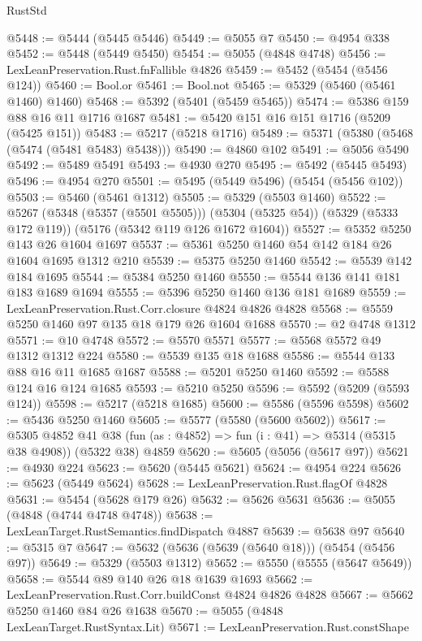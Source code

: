 \begin{lexlean}{RustStd}
\begin{coremodule}
@5448 := @5444 (@5445 @5446)
@5449 := @5055 @7
@5450 := @4954 @338
@5452 := @5448 (@5449 @5450)
@5454 := @5055 (@4848 @4748)
@5456 := LexLeanPreservation.Rust.fnFallible @4826
@5459 := @5452 (@5454 (@5456 @124))
@5460 := Bool.or
@5461 := Bool.not
@5465 := @5329 (@5460 (@5461 @1460) @1460)
@5468 := @5392 (@5401 (@5459 @5465))
@5474 := @5386 @159 @88 @16 @11 @1716 @1687
@5481 := @5420 @151 @16 @151 @1716 (@5209 (@5425 @151))
@5483 := @5217 (@5218 @1716)
@5489 := @5371 (@5380 (@5468 (@5474 (@5481 @5483) @5438)))
@5490 := @4860 @102
@5491 := @5056 @5490
@5492 := @5489 @5491
@5493 := @4930 @270
@5495 := @5492 (@5445 @5493)
@5496 := @4954 @270
@5501 := @5495 (@5449 @5496) (@5454 (@5456 @102))
@5503 := @5460 (@5461 @1312)
@5505 := @5329 (@5503 @1460)
@5522 := @5267
    (@5348 (@5357 (@5501 @5505)))
    (@5304 (@5325 @54))
    (@5329 (@5333 @172 @119))
    (@5176 (@5342 @119 @126 @1672 @1604))
@5527 := @5352 @5250 @143 @26 @1604 @1697
@5537 := @5361 @5250 @1460 @54 @142 @184 @26 @1604 @1695 @1312 @210
@5539 := @5375 @5250 @1460
@5542 := @5539 @142 @184 @1695
@5544 := @5384 @5250 @1460
@5550 := @5544 @136 @141 @181 @183 @1689 @1694
@5555 := @5396 @5250 @1460 @136 @181 @1689
@5559 := LexLeanPreservation.Rust.Corr.closure @4824 @4826 @4828
@5568 := @5559 @5250 @1460 @97 @135 @18 @179 @26 @1604 @1688
@5570 := @2 @4748 @1312
@5571 := @10 @4748
@5572 := @5570 @5571
@5577 := @5568 @5572 @49 @1312 @1312 @224
@5580 := @5539 @135 @18 @1688
@5586 := @5544 @133 @88 @16 @11 @1685 @1687
@5588 := @5201 @5250 @1460
@5592 := @5588 @124 @16 @124 @1685
@5593 := @5210 @5250
@5596 := @5592 (@5209 (@5593 @124))
@5598 := @5217 (@5218 @1685)
@5600 := @5586 (@5596 @5598)
@5602 := @5436 @5250 @1460
@5605 := @5577 (@5580 (@5600 @5602))
@5617 := @5305
    @4852
    @41
    @38
    (fun (as : @4852) => fun (i : @41) => @5314 (@5315 @38 @4908))
    (@5322 @38)
    @4859
@5620 := @5605 (@5056 (@5617 @97))
@5621 := @4930 @224
@5623 := @5620 (@5445 @5621)
@5624 := @4954 @224
@5626 := @5623 (@5449 @5624)
@5628 := LexLeanPreservation.Rust.flagOf @4828
@5631 := @5454 (@5628 @179 @26)
@5632 := @5626 @5631
@5636 := @5055 (@4848 (@4744 @4748 @4748))
@5638 := LexLeanTarget.RustSemantics.findDispatch @4887
@5639 := @5638 @97
@5640 := @5315 @7
@5647 := @5632 (@5636 (@5639 (@5640 @18))) (@5454 (@5456 @97))
@5649 := @5329 (@5503 @1312)
@5652 := @5550 (@5555 (@5647 @5649))
@5658 := @5544 @89 @140 @26 @18 @1639 @1693
@5662 := LexLeanPreservation.Rust.Corr.buildConst @4824 @4826 @4828
@5667 := @5662 @5250 @1460 @84 @26 @1638
@5670 := @5055 (@4848 LexLeanTarget.RustSyntax.Lit)
@5671 := LexLeanPreservation.Rust.constShape

\end{coremodule}
\end{lexlean}
